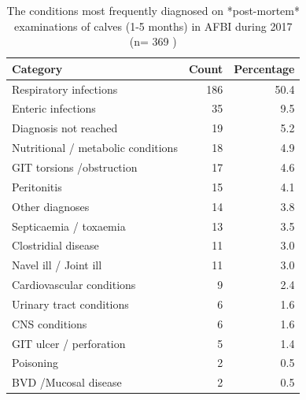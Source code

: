 \documentclass[]{book}
\begin{document}
\begin{table}

\caption{\label{tab:unnamed-chunk-10}The conditions most frequently diagnosed on *post-mortem* examinations of calves (1-5 months) in  AFBI during 2017  (n= 369 )}
\centering
\begin{tabular}[t]{l|r|r}
\hline
Category & Count & Percentage\\
\hline
Respiratory infections & 186 & 50.4\\
\hline
Enteric infections & 35 & 9.5\\
\hline
Diagnosis not reached & 19 & 5.2\\
\hline
Nutritional / metabolic conditions & 18 & 4.9\\
\hline
GIT torsions /obstruction & 17 & 4.6\\
\hline
Peritonitis & 15 & 4.1\\
\hline
Other diagnoses & 14 & 3.8\\
\hline
Septicaemia / toxaemia & 13 & 3.5\\
\hline
Clostridial disease & 11 & 3.0\\
\hline
Navel ill / Joint ill & 11 & 3.0\\
\hline
Cardiovascular conditions & 9 & 2.4\\
\hline
Urinary tract conditions & 6 & 1.6\\
\hline
CNS conditions & 6 & 1.6\\
\hline
GIT ulcer / perforation & 5 & 1.4\\
\hline
Poisoning & 2 & 0.5\\
\hline
BVD /Mucosal disease & 2 & 0.5\\
\hline
\end{tabular}
\end{table}
\end{document}
